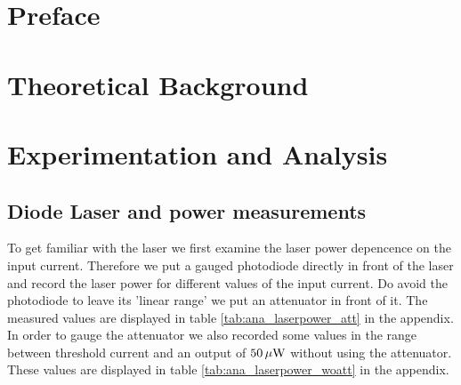 \documentclass{protokoll_en}
\begin{document}
\section{Preface}

\section{Theoretical Background}

\section{Experimentation and Analysis}
\subsection{Diode Laser and power measurements}\label{ana_laserpower}
To get familiar with the laser we first examine the laser power depencence on the input current. Therefore we put a gauged photodiode directly in front of the laser and record the laser power for different values of the input current. Do avoid the photodiode to leave its 'linear range' we put an attenuator in front of it. The measured values are displayed in table \ref{tab:ana_laserpower_att} in the appendix. In order to gauge the attenuator we also recorded some values in the range between threshold current and an output of $\unit[50]{\mu W}$ without using the attenuator. These values are displayed in table \ref{tab:ana_laserpower_woatt} in the appendix.
\end{document}

